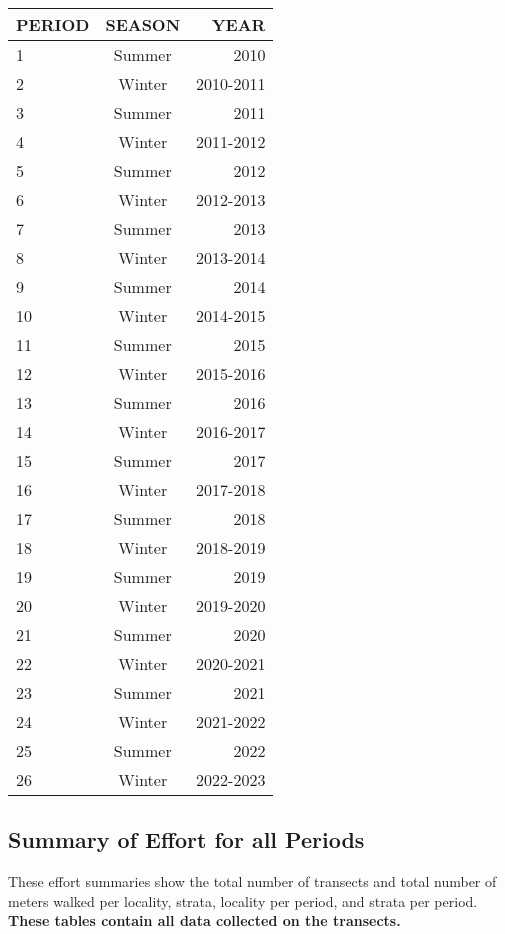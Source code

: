 \documentclass[
]{article}
\begin{document}
\begin{longtable}[]{@{}lcr@{}}
\toprule()
PERIOD & SEASON & YEAR \\
\midrule()
\endhead
1 & Summer & 2010 \\
2 & Winter & 2010-2011 \\
3 & Summer & 2011 \\
4 & Winter & 2011-2012 \\
5 & Summer & 2012 \\
6 & Winter & 2012-2013 \\
7 & Summer & 2013 \\
8 & Winter & 2013-2014 \\
9 & Summer & 2014 \\
10 & Winter & 2014-2015 \\
11 & Summer & 2015 \\
12 & Winter & 2015-2016 \\
13 & Summer & 2016 \\
14 & Winter & 2016-2017 \\
15 & Summer & 2017 \\
16 & Winter & 2017-2018 \\
17 & Summer & 2018 \\
18 & Winter & 2018-2019 \\
19 & Summer & 2019 \\
20 & Winter & 2019-2020 \\
21 & Summer & 2020 \\
22 & Winter & 2020-2021 \\
23 & Summer & 2021 \\
24 & Winter & 2021-2022 \\
25 & Summer & 2022 \\
26 & Winter & 2022-2023 \\
\bottomrule()
\end{longtable}

\endgroup

\newpage

\hypertarget{summary-of-effort-for-all-periods}{%
\subsection{Summary of Effort for all
Periods}\label{summary-of-effort-for-all-periods}}

These effort summaries show the total number of transects and total
number of meters walked per locality, strata, locality per period, and
strata per period. \textbf{These tables contain all data collected on
the transects.}
\end{document}
